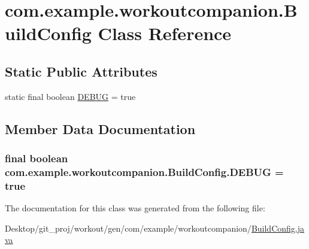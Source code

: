 \hypertarget{classcom_1_1example_1_1workoutcompanion_1_1_build_config}{\section{com.\-example.\-workoutcompanion.\-Build\-Config Class Reference}
\label{classcom_1_1example_1_1workoutcompanion_1_1_build_config}
}
\subsection*{Static Public Attributes}
\begin{DoxyCompactItemize}
\item 
static final boolean \hyperlink{classcom_1_1example_1_1workoutcompanion_1_1_build_config_ae965e9b7606aa3b310518a23056acca0}{D\-E\-B\-U\-G} = true
\end{DoxyCompactItemize}


\subsection{Member Data Documentation}
\hypertarget{classcom_1_1example_1_1workoutcompanion_1_1_build_config_ae965e9b7606aa3b310518a23056acca0}{
\subsubsection[{D\-E\-B\-U\-G}]{\setlength{\rightskip}{0pt plus 5cm}final boolean com.\-example.\-workoutcompanion.\-Build\-Config.\-D\-E\-B\-U\-G = true\hspace{0.3cm}{\ttfamily [static]}}}\label{classcom_1_1example_1_1workoutcompanion_1_1_build_config_ae965e9b7606aa3b310518a23056acca0}


The documentation for this class was generated from the following file\-:\begin{DoxyCompactItemize}
\item 
Desktop/git\-\_\-proj/workout/gen/com/example/workoutcompanion/\hyperlink{_build_config_8java}{Build\-Config.\-java}\end{DoxyCompactItemize}
